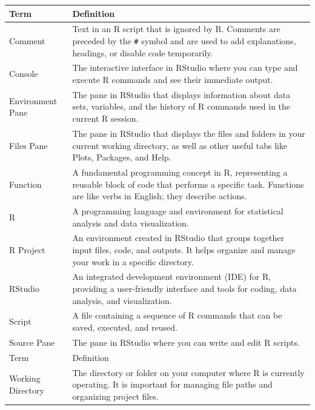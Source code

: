 \documentclass[
]{book}
\begin{document}
\begin{longtable}[]{@{}
  >{\raggedright\arraybackslash}p{}
  >{\raggedright\arraybackslash}p{}@{}}
\toprule\noalign{}
\begin{minipage}[b]{\linewidth}\raggedright
Term
\end{minipage} & \begin{minipage}[b]{\linewidth}\raggedright
Definition
\end{minipage} \\
\midrule\noalign{}
\endhead
\bottomrule\noalign{}
\endlastfoot
Comment & Text in an R script that is ignored by R. Comments are preceded by the \texttt{\#} symbol and are used to add explanations, headings, or disable code temporarily. \\
Console & The interactive interface in RStudio where you can type and execute R commands and see their immediate output. \\
Environment Pane & The pane in RStudio that displays information about data sets, variables, and the history of R commands used in the current R session. \\
Files Pane & The pane in RStudio that displays the files and folders in your current working directory, as well as other useful tabs like Plots, Packages, and Help. \\
Function & A fundamental programming concept in R, representing a reusable block of code that performs a specific task. Functions are like verbs in English; they describe actions. \\
R & A programming language and environment for statistical analysis and data visualization. \\
R Project & An environment created in RStudio that groups together input files, code, and outputs. It helps organize and manage your work in a specific directory. \\
RStudio & An integrated development environment (IDE) for R, providing a user-friendly interface and tools for coding, data analysis, and visualization. \\
Script & A file containing a sequence of R commands that can be saved, executed, and reused. \\
Source Pane & The pane in RStudio where you can write and edit R scripts. \\
Term & Definition \\
Working Directory & The directory or folder on your computer where R is currently operating. It is important for managing file paths and organizing project files. \\
\end{longtable}
\end{document}
